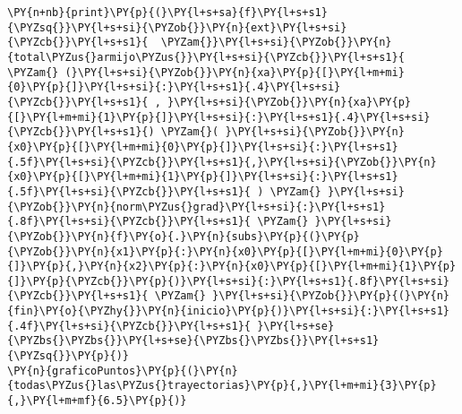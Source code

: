 \begin{itemize}
\begin{tcolorbox}[breakable, size=fbox, boxrule=1pt, pad at break*=1mm,colback=cellbackground, colframe=cellborder]
\begin{Verbatim}[commandchars=\\\{\}]
        \PY{n+nb}{print}\PY{p}{(}\PY{l+s+sa}{f}\PY{l+s+s1}{\PYZsq{}}\PY{l+s+si}{\PYZob{}}\PY{n}{ext}\PY{l+s+si}{\PYZcb{}}\PY{l+s+s1}{  \PYZam{}}\PY{l+s+si}{\PYZob{}}\PY{n}{total\PYZus{}armijo\PYZus{}}\PY{l+s+si}{\PYZcb{}}\PY{l+s+s1}{ \PYZam{} (}\PY{l+s+si}{\PYZob{}}\PY{n}{xa}\PY{p}{[}\PY{l+m+mi}{0}\PY{p}{]}\PY{l+s+si}{:}\PY{l+s+s1}{.4}\PY{l+s+si}{\PYZcb{}}\PY{l+s+s1}{ , }\PY{l+s+si}{\PYZob{}}\PY{n}{xa}\PY{p}{[}\PY{l+m+mi}{1}\PY{p}{]}\PY{l+s+si}{:}\PY{l+s+s1}{.4}\PY{l+s+si}{\PYZcb{}}\PY{l+s+s1}{) \PYZam{}( }\PY{l+s+si}{\PYZob{}}\PY{n}{x0}\PY{p}{[}\PY{l+m+mi}{0}\PY{p}{]}\PY{l+s+si}{:}\PY{l+s+s1}{.5f}\PY{l+s+si}{\PYZcb{}}\PY{l+s+s1}{,}\PY{l+s+si}{\PYZob{}}\PY{n}{x0}\PY{p}{[}\PY{l+m+mi}{1}\PY{p}{]}\PY{l+s+si}{:}\PY{l+s+s1}{.5f}\PY{l+s+si}{\PYZcb{}}\PY{l+s+s1}{ ) \PYZam{} }\PY{l+s+si}{\PYZob{}}\PY{n}{norm\PYZus{}grad}\PY{l+s+si}{:}\PY{l+s+s1}{.8f}\PY{l+s+si}{\PYZcb{}}\PY{l+s+s1}{ \PYZam{} }\PY{l+s+si}{\PYZob{}}\PY{n}{f}\PY{o}{.}\PY{n}{subs}\PY{p}{(}\PY{p}{\PYZob{}}\PY{n}{x1}\PY{p}{:}\PY{n}{x0}\PY{p}{[}\PY{l+m+mi}{0}\PY{p}{]}\PY{p}{,}\PY{n}{x2}\PY{p}{:}\PY{n}{x0}\PY{p}{[}\PY{l+m+mi}{1}\PY{p}{]}\PY{p}{\PYZcb{}}\PY{p}{)}\PY{l+s+si}{:}\PY{l+s+s1}{.8f}\PY{l+s+si}{\PYZcb{}}\PY{l+s+s1}{ \PYZam{} }\PY{l+s+si}{\PYZob{}}\PY{p}{(}\PY{n}{fin}\PY{o}{\PYZhy{}}\PY{n}{inicio}\PY{p}{)}\PY{l+s+si}{:}\PY{l+s+s1}{.4f}\PY{l+s+si}{\PYZcb{}}\PY{l+s+s1}{ }\PY{l+s+se}{\PYZbs{}\PYZbs{}}\PY{l+s+se}{\PYZbs{}\PYZbs{}}\PY{l+s+s1}{\PYZsq{}}\PY{p}{)}
\PY{n}{graficoPuntos}\PY{p}{(}\PY{n}{todas\PYZus{}las\PYZus{}trayectorias}\PY{p}{,}\PY{l+m+mi}{3}\PY{p}{,}\PY{l+m+mf}{6.5}\PY{p}{)}
\end{Verbatim}
\end{tcolorbox}
   

\end{itemize}
